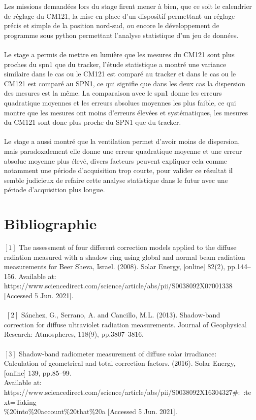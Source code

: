\documentclass[12pt,a4paper]{article}
\begin{document}
\begin{flushleft}
Les missions demandées lors du stage firent mener à bien, que ce soit le calendrier de réglage du CM121, la mise en place d'un dispositif permettant un réglage précis et simple de la position nord-sud, ou encore le développement de programme sous python permettant l'analyse statistique d'un jeu de données.\\
~\\
Le stage a permis de mettre en lumière que les mesures du CM121 sont plus proches du spn1 que du tracker, l'étude statistique a montré une variance similaire dans le cas ou le CM121 est comparé au tracker et dans le cas ou le CM121 est comparé au SPN1, ce qui signifie que dans les deux cas la dispersion des mesures est la même. La comparaison avec le spn1 donne les erreurs quadratique  moyennes et les erreurs absolues moyennes les plus faible, ce qui montre que les mesures ont   moins d'erreurs élevées et systématiques, les mesures du CM121 sont donc plus proche du SPN1 que du tracker.\\
~\\
Le stage a aussi montré que la ventilation permet d'avoir moins de dispersion, mais paradoxalement elle donne une erreur quadratique moyenne et une erreur absolue moyenne plus élevé, divers facteurs peuvent expliquer cela comme notamment une période d'acquisition trop courte, pour valider ce résultat il semble judicieux de refaire cette analyse statistique dans le futur avec une période d'acquisition plus longue.

\newpage

\section{Bibliographie}


$[1]$ The assessment of four different correction models applied to the diffuse radiation measured with a shadow ring using global and normal beam radiation measurements for Beer Sheva, Israel. (2008). Solar Energy, [online] 82(2), pp.144–156. Available at: https://www.sciencedirect.com/science/article/abs/pii/S0038092X07001338 [Accessed 5 Jun. 2021].\\
~\\
‌
$[2]$ Sánchez, G., Serrano, A. and Cancillo, M.L. (2013). Shadow-band correction for diffuse ultraviolet radiation measurements. Journal of Geophysical Research: Atmospheres, 118(9), pp.3807–3816.\\

‌~\\
$[3]$ Shadow-band radiometer measurement of diffuse solar irradiance: Calculation of geometrical and total correction factors. (2016). Solar Energy, [online] 139, pp.85–99.\\ 
Available at: https://www.sciencedirect.com/science/article/abs/pii/S0038092X16304327\#:~:text=Taking\\\%20into\%20account\%20that\%20a [Accessed 5 Jun. 2021].\\


\end{flushleft}
\end{document}
